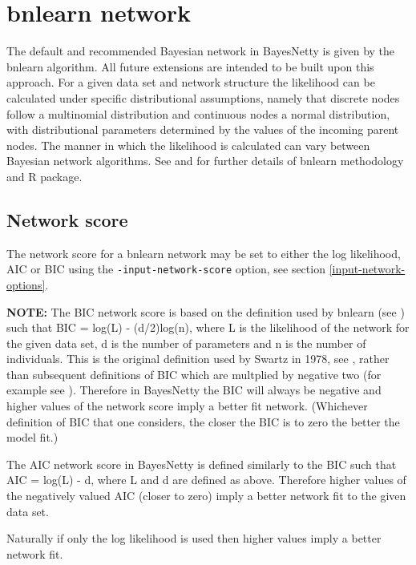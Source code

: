 \documentclass[a4paper,12pt]{article}
\newcommand{\code}[1]{{\footnotesize{{\tt #1}}}}
\begin{document}
\section{bnlearn network}
\label{bnlearn}

The default and recommended Bayesian network in BayesNetty is given by the bnlearn algorithm. All future extensions are intended to be built upon this approach. For a given data set and network structure the likelihood can be calculated under specific distributional assumptions, namely that discrete nodes follow a multinomial distribution and continuous nodes a normal distribution, with distributional parameters determined by the values of the incoming parent nodes. The manner in which the likelihood is calculated can vary between Bayesian network algorithms. See \citet{bnlearn} and \citet{bnlearn2} for further details of bnlearn methodology and R package. 
\subsection{Network score}
\label{bnlearn-score}

The network score for a bnlearn network may be set to either the log likelihood, AIC or BIC using the \code{-input-network-score} option, see  section \ref{input-network-options}. 

{\bf NOTE:} The BIC network score is based on the definition used by bnlearn (see \citet{bnlearn}) such that BIC = log(L) - (d/2)log(n), where L is the likelihood of the network for the given data set, d is the number of parameters and n is the number of individuals. This is the original definition used by Swartz in 1978, see \citet{swartz:1978}, rather than subsequent definitions of BIC which are multplied by negative two (for example see \citet{wit:2012}). Therefore in BayesNetty the BIC will always be negative and higher values of the network score imply a better fit network. (Whichever definition of BIC that one considers, the closer the BIC is to zero the better the model fit.) 

The AIC network score in BayesNetty is defined similarly to the BIC such that AIC = log(L) - d, where L and d are defined as above. Therefore higher values of the negatively valued AIC (closer to zero) imply a better network fit to the given data set. 

Naturally if only the log likelihood is used then higher values imply a better network fit. 

\end{document}
